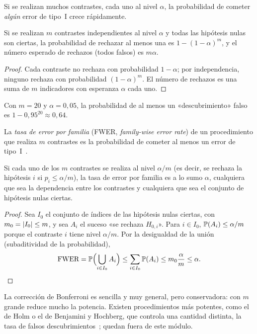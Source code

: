 Si se realizan muchos contrastes, cada uno al nivel $\alpha$, la probabilidad de cometer \emph{algún} error de tipo~I crece rápidamente.

\begin{proposicion}\label{prop:t5-multiples}
Si se realizan $m$ contrastes independientes al nivel $\alpha$ y todas las hipótesis nulas son ciertas, la probabilidad de rechazar al menos una es $1-(1-\alpha)^{m}$, y el número esperado de rechazos (todos falsos) es $m\alpha$.
\end{proposicion}

\begin{proof}
Cada contraste no rechaza con probabilidad $1-\alpha$; por independencia, ninguno rechaza con probabilidad $(1-\alpha)^{m}$. El número de rechazos es una suma de $m$ indicadores con esperanza $\alpha$ cada uno.
\end{proof}

Con $m=20$ y $\alpha=0{,}05$, la probabilidad de al menos un «descubrimiento» falso es $1-0{,}95^{20}\approx0{,}64$.

\begin{definicion}\label{def:t5-fwer}
La \emph{tasa de error por familia} (FWER, \emph{family-wise error rate}) de un procedimiento que realiza $m$ contrastes es la probabilidad de cometer al menos un error de tipo~I~\cite[clase~11]{stats200}.
\end{definicion}

\begin{teorema}\label{teo:t5-bonferroni}
Si cada uno de los $m$ contrastes se realiza al nivel $\alpha/m$ (es decir, se rechaza la hipótesis $i$ si $p_i\le\alpha/m$), la tasa de error por familia es a lo sumo $\alpha$, cualquiera que sea la dependencia entre los contrastes y cualquiera que sea el conjunto de hipótesis nulas ciertas.
\end{teorema}

\begin{proof}
Sea $I_0$ el conjunto de índices de las hipótesis nulas ciertas, con $m_0=\lvert I_0\rvert\le m$, y sea $A_i$ el suceso «se rechaza $H_{0,i}$». Para $i\in I_0$, $\mathbb{P}(A_i)\le\alpha/m$ porque el contraste $i$ tiene nivel $\alpha/m$. Por la desigualdad de la unión (subaditividad de la probabilidad),
\[
\text{FWER}=\mathbb{P}\Bigl(\bigcup_{i\in I_0}A_i\Bigr)\le\sum_{i\in I_0}\mathbb{P}(A_i)\le m_0\frac{\alpha}{m}\le\alpha.\qedhere
\]
\end{proof}

La corrección de Bonferroni es sencilla y muy general, pero conservadora: con $m$ grande reduce mucho la potencia. Existen procedimientos más potentes, como el de Holm o el de Benjamini y Hochberg, que controla una cantidad distinta, la tasa de falsos descubrimientos~\cite[clase~11]{stats200}; quedan fuera de este módulo.

